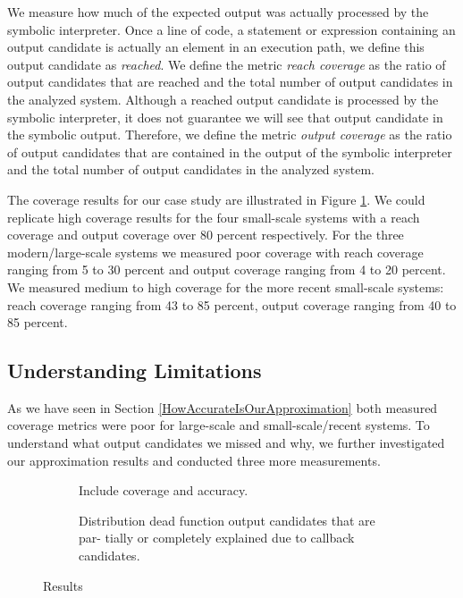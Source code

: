 \documentclass[sigconf]{acmart}
\begin{document}
We measure how much of the expected output was actually processed by the
symbolic interpreter.  Once a line of code, a statement or expression
containing an output candidate is actually an element in an execution path, we
define this output candidate as \emph{reached}. We define the metric \emph{reach
coverage} as the ratio of output candidates that are reached and the total
number of output candidates in the analyzed system. Although a reached output
candidate is processed by the symbolic interpreter, it does not guarantee we
will see that output candidate in the symbolic output. Therefore, we define the
metric \emph{output coverage} as the ratio of output candidates that are
contained in the output of the symbolic interpreter and the total number of
output candidates in the analyzed system.  

The coverage results for our case study are illustrated in Figure
\ref{coverage}. We could replicate high coverage results for the four small-scale systems with a reach
coverage and output coverage over 80 percent respectively. For the three
modern/large-scale systems we measured poor coverage with reach coverage
ranging from 5 to 30 percent and output coverage ranging from 4 to 20 percent.
We measured medium to high coverage for the more recent small-scale systems:
reach coverage ranging from 43 to 85 percent, output coverage ranging from 40
to 85 percent.

\subsection{Understanding Limitations} \label{sec:understanding_limitations}
As we have seen in Section \ref{HowAccurateIsOurApproximation} both measured
coverage metrics were poor for large-scale and small-scale/recent systems. To
understand what output candidates we missed and why, we further investigated
our approximation results and conducted three more measurements.

\begin{figure}[h!]
	\begin{subfigure}[center]{0.48\textwidth}
		
		\caption{\label{coverage}}
	\end{subfigure}
	
	\begin{subfigure}[center]{0.48\textwidth}
		
		\caption{
			Include coverage and accuracy.
			\label{fig:include_coverage_results}
		}
	\end{subfigure}
	
	
	\begin{subfigure}[center]{0.48\textwidth}
		
		\caption{
			Distribution dead function output candidates that are par-
			tially or completely explained due to callback candidates.
			\label{fig:output_candidate_explanation}
		}
		
	\end{subfigure}
	\caption{Results}
\end{figure}
\end{document}
